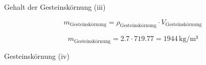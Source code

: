 \begin{frame}{Gehalt der Gesteinskörnung (iii)}

    \begin{equation*}
        m_{\text{Gesteinskörnung}} = \rho_{\text{Gesteinskörnung}} \cdot V_{\text{Gesteinskörnung}}
    \end{equation*}

    \pause
    \vspace{1cm}
    \begin{equation*}
        m_{\text{Gesteinskörnung}} = 2.7 \cdot 719.77 = 1944 \, \text{kg/m³}
    \end{equation*}

\end{frame}


\begin{frame}{Gesteinskörnung (iv)}
    \begin{table}[h]
        \centering
        \caption{Aufgabe zur Stoffraumberechnung}
        \small
    \label{tab:Stoffraumberechnung}
        \end{table}

\end{frame}

